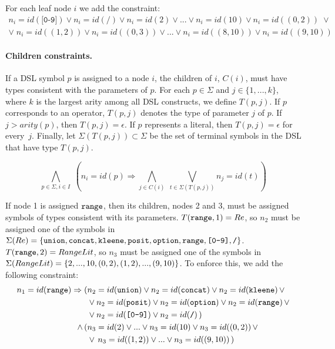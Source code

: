 \begin{example}\label{ex:leaf-constraints}
For each leaf node \(i\) we add the constraint:
\begin{gather*}
    n_i = id(\texttt{[0-9]}) \lor n_i = id(\texttt{/}) \lor n_i = id(2) \lor ... \lor n_i = id(10) \lor n_i = id((0,2)) \;\lor \\
    \lor\; n_i = id((1,2)) \lor  n_i = id((0,3)) \lor ... \lor  n_i = id((8,10))\lor  n_i = id((9,10)) 
\end{gather*}
\end{example}


\paragraph{Children constraints.}
If a DSL symbol \(p\) is assigned to a node \(i\), the children of \(i\), \(C(i)\), must have types consistent with the parameters of \(p\).
For each \(p \in \Sigma\) and \(j \in \{1, ..., k\}\), where \(k\) is the largest arity among all DSL constructs, we define \(T(p, j)\).
If \(p\) corresponds to an operator, \(T(p, j)\) denotes the type of parameter \(j\) of \(p\). If \({j > arity(p)}\), then \(T(p,j) = \epsilon\).
If \(p\) represents a literal, then \(T(p,j) = \epsilon\) for every~\(j\).
Finally, let \(\Sigma(T(p,j)) \subset \Sigma\) be the set of terminal symbols in the \ac{DSL} that have type \(T(p,j)\).

\begin{equation}
    \bigwedge_{p \in \Sigma, i \in I}\; \left(n_i = id(p) \Rightarrow \bigwedge_{j \in C(i)} \; \bigvee_{t \in \Sigma(T(p,j))} n_j = id(t) \right)
\end{equation}

\begin{example}\label{ex:children-constraints}
If node 1 is assigned \(\texttt{range}\), then its children, nodes 2 and 3, must be assigned symbols of types consistent with its parameters. \({T(\texttt{range}, 1) = Re}\), so \(n_2\) must be assigned one of the symbols in
\(\Sigma(Re)=\{\texttt{union}, \texttt{concat},\allowbreak \texttt{kleene},\allowbreak \texttt{posit},\allowbreak \texttt{option},\allowbreak \texttt{range}, \texttt{[0-9]}, \texttt{/}\}\).
\(T(\texttt{range}, 2) = RangeLit\), so \(n_3\) must be assigned one of the symbols in \(\Sigma(RangeLit) = \{2,\allowbreak ...,\allowbreak 10,\allowbreak (0,2),\allowbreak (1,2),\allowbreak ... ,\allowbreak (9,10)\}\).
To enforce this, we add the following constraint:
\begin{align*}
    n_1=id(\texttt{range}) \Rightarrow (&n_2=id(\texttt{union}) \lor n_2=id(\texttt{concat}) \lor n_2=id(\texttt{kleene}) \,\lor\\
    &\lor n_2=id(\texttt{posit}) \lor n_2=id(\texttt{option}) \lor n_2=id(\texttt{range}) \,\lor\\
    &\lor n_2=id(\texttt{[0-9]}) \lor n_2=id(\texttt{/})\,) \\
    \land \, (&n_3=id(2) \lor ... \lor n_3=id(10) \lor n_3=id((0,2)) \,\lor \\
    &\lor\, n_3=id((1,2)) \lor ... \lor  n_3=id((9,10))\,)
\end{align*}
\end{example}

